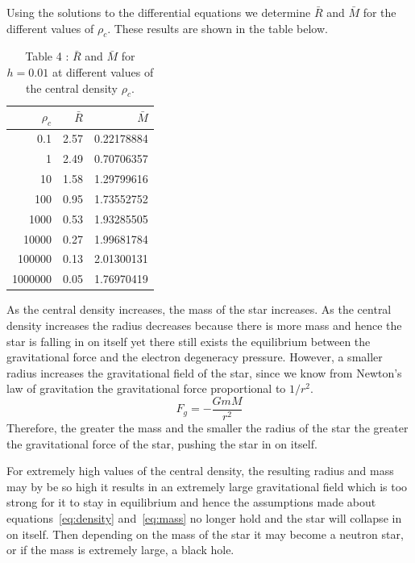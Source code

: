 \documentclass[a4paper]{IEEEtran}
\begin{document}
    Using the solutions to the differential equations we determine 
    $\bar{R}$ and $\bar{M}$ for the different values of $\rho_c$.
    These results are shown in the table below.

    \begin{table}
    \caption{Table 4 : $\bar{R}$ and $\bar{M}$ for $h = 0.01$ at different
                  values of the central density $\rho_c$.} 
    \label{tbl:central-density} 
    \begin{center}
    \begin{tabular}{r|rr} \hline
    $\rho_c$&   $\bar{R}$   &   $\bar{M}$       \\ \hline
    0.1     &   2.57        &   0.22178884     \\ 
    1       &   2.49        &   0.70706357     \\ 
    10      &   1.58        &   1.29799616     \\ 
    100     &   0.95        &   1.73552752      \\ 
    1000    &   0.53        &   1.93285505      \\ 
    10000   &   0.27        &   1.99681784      \\ 
    100000  &   0.13        &   2.01300131      \\ 
    1000000 &   0.05        &   1.76970419      \\ \hline
    \end{tabular}
    \end{center}
    \end{table} 

    As the central density increases, the mass of the star increases.
    As the central density increases the radius decreases because there 
    is more mass and hence the star is falling in on itself yet there still
    exists the equilibrium between the gravitational force and the electron
    degeneracy pressure. However, a smaller radius increases the gravitational
    field of the star, since we know from Newton's law of gravitation
    the gravitational force proportional to $1/r^2$.
    \begin{equation}
        F_g = -\frac{GmM}{r^2}
    \end{equation}
    Therefore, the greater the mass and the smaller the radius of the 
    star the greater the gravitational force of the star, pushing the star
    in on itself. 

    For extremely high values of the central density, the resulting radius
    and mass may by be so high it results in an extremely large gravitational
    field which is too strong for it to stay in equilibrium and hence 
    the assumptions made about equations~\ref{eq:density} and~\ref{eq:mass}
    no longer hold and the star will collapse in on itself. Then depending on
    the mass of the star it may become a neutron star, or if the mass is 
    extremely large, a black hole.
\end{document}
